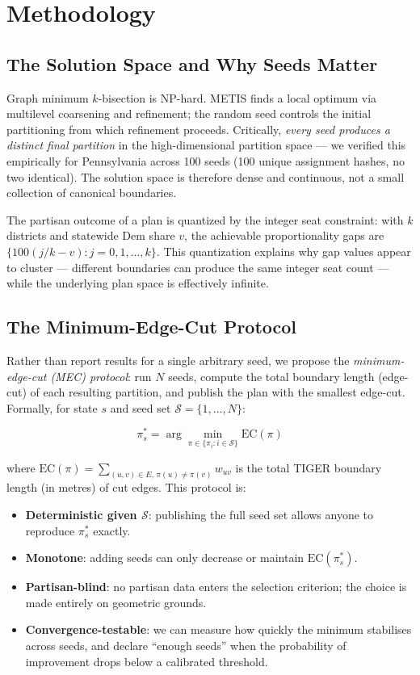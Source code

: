 \section{Methodology}
\label{sec:methodology}

\subsection{The Solution Space and Why Seeds Matter}
\label{sec:methodology:space}

Graph minimum $k$-bisection is NP-hard. METIS finds a local optimum via
multilevel coarsening and refinement; the random seed controls the initial
partitioning from which refinement proceeds. Critically, \emph{every seed
produces a distinct final partition} in the high-dimensional partition space
--- we verified this empirically for Pennsylvania across 100 seeds (100 unique
assignment hashes, no two identical). The solution space is therefore dense and
continuous, not a small collection of canonical boundaries.

The partisan outcome of a plan is quantized by the integer seat constraint:
with $k$ districts and statewide Dem share $v$, the achievable proportionality
gaps are $\{100(j/k - v) : j = 0, 1, \ldots, k\}$. This quantization explains
why gap values appear to cluster --- different boundaries can produce the same
integer seat count --- while the underlying plan space is effectively infinite.

\subsection{The Minimum-Edge-Cut Protocol}
\label{sec:methodology:protocol}

Rather than report results for a single arbitrary seed, we propose the
\emph{minimum-edge-cut (MEC) protocol}: run $N$ seeds, compute the total
boundary length (edge-cut) of each resulting partition, and publish the
plan with the smallest edge-cut. Formally, for state $s$ and seed set
$\mathcal{S} = \{1, \ldots, N\}$:

\[
  \pi^*_s = \arg\min_{\pi \in \{\pi_i : i \in \mathcal{S}\}} \mathrm{EC}(\pi)
\]

where $\mathrm{EC}(\pi) = \sum_{(u,v) \in E,\, \pi(u) \neq \pi(v)} w_{uv}$
is the total TIGER boundary length (in metres) of cut edges. This protocol is:
\begin{itemize}
  \item \textbf{Deterministic given $\mathcal{S}$}: publishing the full seed
        set allows anyone to reproduce $\pi^*_s$ exactly.
  \item \textbf{Monotone}: adding seeds can only decrease or maintain
        $\mathrm{EC}(\pi^*_s)$.
  \item \textbf{Parti\-san-blind}: no partisan data enters the selection
        criterion; the choice is made entirely on geometric grounds.
  \item \textbf{Convergence-testable}: we can measure how quickly the minimum
        stabilises across seeds, and declare ``enough seeds'' when the
        probability of improvement drops below a calibrated threshold.
\end{itemize}


